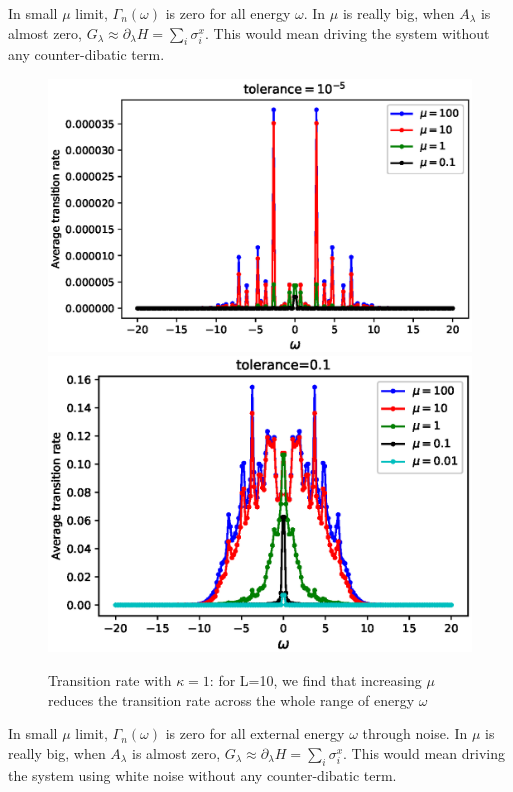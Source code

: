 \documentclass[11pt,a4paper]{article}
\begin{document}
In small $\mu$ limit,  $\Gamma_n (\omega)$ is zero for all energy $\omega$. In  $\mu$ is really big, when $A_{\lambda}$ is almost zero, $ G_{\lambda} \approx \partial_{\lambda} H = \sum_i \sigma_i^x$.  This would mean driving the system without any counter-dibatic term. 

\begin{figure}[!ht]
\begin{center}
\includegraphics[scale=0.53]{new_pics/transition_rate_low_tol.eps}
\includegraphics[scale=0.53]{new_pics/transition_rate_high_tol.eps}
\caption{Transition rate with $\kappa=1$: for L=10, we find that increasing $\mu$ reduces the transition rate across the whole range of energy $\omega$}
\label{L10_transition}
\end{center}
\end{figure}

In small $\mu$ limit,  $\Gamma_n (\omega)$ is zero for all external energy $\omega$ through noise. In  $\mu$ is really big, when $A_{\lambda}$ is almost zero, $ G_{\lambda} \approx \partial_{\lambda} H = \sum_i \sigma_i^x$.  This would mean driving the system using white noise without any counter-dibatic term. 
\end{document}
